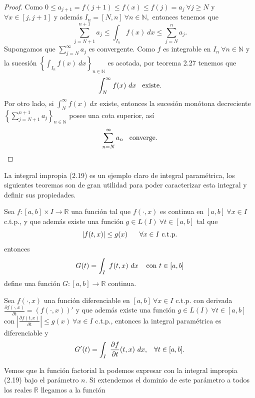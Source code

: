 \begin{proof}
	Como $0 \leq a_{j+1} = f(j+1) \leq f(x) \leq f(j) = a_j\ \forall j \geq N$ y $\forall x \in [j,j+1]$ y además $I_n = [N,n]\ \forall n \in \mathbb{N},$ entonces tenemos que $$\sum_{j = N+1}^{n+1}a_j \leq \int_{I_n}f(x)\ dx \leq \sum_{j = N}^{n}a_j.$$ Supongamos que $\sum_{j = N}^{\infty}a_j$ es convergente. Como $f$ es integrable en $I_n\ \forall n \in \mathbb{N}$ y la sucesión $\left\{\int_{I_n}f(x)\ dx\right\}_{n \in \mathbb{N}}$ es acotada, por teorema 2.27 tenemos que $$\int_{N}^{\infty}f(x)\ dx\hspace{0.3cm}\textrm{existe.}$$
	Por otro lado, si $\int_{N}^{\infty}f(x)\ dx$ existe, entonces la sucesión monótona decreciente $\left\{\sum_{j = N+1}^{n+1}a_j\right\}_{n \in \mathbb{N}}$ posee una cota superior, así $$\sum_{n = N}^{\infty}a_n\hspace{0.3cm}\textrm{converge.}$$
\end{proof}
La integral impropia (2.19) es un ejemplo claro de integral paramétrica, los siguientes teoremas son de gran utilidad para poder caracterizar esta integral y definir sus propiedades.
\begin{theorem}
	Sea $f:[a,b]\times I \rightarrow \mathbb{R}$ una función tal que $f(\cdot,x)$ es continua en $[a,b]\ \forall x \in I$ c.t.p., y que además existe una función $g \in L(I)\ \forall t \in [a,b]$ tal que $$|f(t,x)| \leq g(x)\hspace{0.6cm}\forall x \in I\ \textrm{c.t.p.}$$ entonces $$G(t) = \int_{I}\ f(t,x)\ dx\hspace{0.4cm}\textrm{con}\ t \in [a,b]$$ define una función $G:[a,b] \rightarrow \mathbb{R}$ continua. 
\end{theorem}
\begin{theorem}
	Sea $f(\cdot,x)$ una función diferenciable en $[a,b]\ \forall x \in I$ c.t.p. con derivada $\frac{\partial f(\cdot,x)}{\partial t} = (f(\cdot,x))'$ y que además existe una función $g \in L(I)\ \forall t \in [a,b]$ con $\left|\frac{\partial f(t,x)}{\partial t}\right| \leq g(x)\ \forall x \in I$ c.t.p., entonces la integral paramétrica es diferenciable y $$G'(t) = \int_{I}\ \frac{\partial f}{\partial t}(t,x)\ dx,\hspace{0.3cm}\forall t \in [a,b].$$
\end{theorem}
Vemos que la función factorial la podemos expresar con la integral impropia (2.19) bajo el parámetro $n.$ Si extendemos el dominio de este parámetro a todos los reales $\mathbb{R}$ llegamos a la función 

